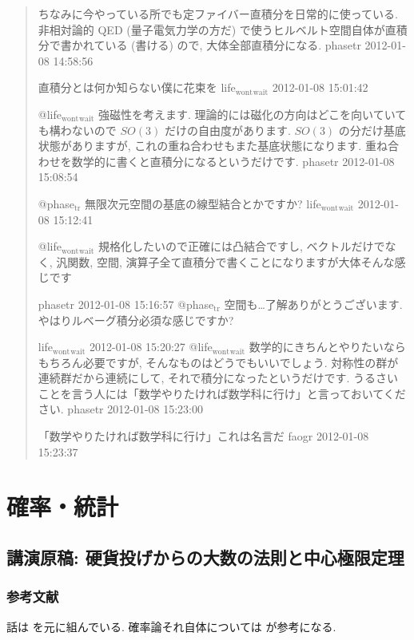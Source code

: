 \documentclass[openany, a4paper, oneside]{jsbook}
\theoremstyle{break}
\theoremstyle{breakdefn}
\begin{document}
\begin{quote}
ちなみに今やっている所でも定ファイバー直積分を日常的に使っている.
非相対論的 QED (量子電気力学の方だ) で使うヒルベルト空間自体が直積分で書かれている (書ける) ので, 大体全部直積分になる.
phasetr 2012-01-08 14:58:56

直積分とは何か知らない僕に花束を
life$_{\mathrm{wont}}$$_{\mathrm{wait}}$ 2012-01-08 15:01:42

@life$_{\mathrm{wont}}$$_{\mathrm{wait}}$ 強磁性を考えます.
理論的には磁化の方向はどこを向いていても構わないので $SO (3)$ だけの自由度があります.
$SO (3)$ の分だけ基底状態がありますが, これの重ね合わせもまた基底状態になります.
重ね合わせを数学的に書くと直積分になるというだけです.
phasetr 2012-01-08 15:08:54

@phase$_{\mathrm{tr}}$ 無限次元空間の基底の線型結合とかですか?
life$_{\mathrm{wont}}$$_{\mathrm{wait}}$ 2012-01-08 15:12:41

@life$_{\mathrm{wont}}$$_{\mathrm{wait}}$ 規格化したいので正確には凸結合ですし,
ベクトルだけでなく, 汎関数, 空間, 演算子全て直積分で書くことになりますが大体そんな感じです

phasetr 2012-01-08 15:16:57
@phase$_{\mathrm{tr}}$ 空間も…了解ありがとうございます. やはりルベーグ積分必須な感じですか?

life$_{\mathrm{wont}}$$_{\mathrm{wait}}$ 2012-01-08 15:20:27
@life$_{\mathrm{wont}}$$_{\mathrm{wait}}$ 数学的にきちんとやりたいならもちろん必要ですが, そんなものはどうでもいいでしょう.
対称性の群が連続群だから連続にして, それで積分になったというだけです.
うるさいことを言う人には「数学やりたければ数学科に行け」と言っておいてください.
phasetr 2012-01-08 15:23:00

「数学やりたければ数学科に行け」これは名言だ
faogr 2012-01-08 15:23:37
\end{quote}
\part{確率・統計}

\chapter{講演原稿: 硬貨投げからの大数の法則と中心極限定理}

\section{参考文献}


話は \cite{MarkKac1} を元に組んでいる.
確率論それ自体については \cite{TadahisaFunaki1} が参考になる.
\end{document}
